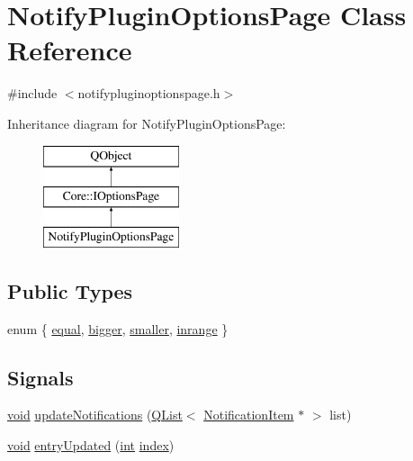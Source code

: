 \hypertarget{class_notify_plugin_options_page}{\section{Notify\-Plugin\-Options\-Page Class Reference}
\label{class_notify_plugin_options_page}
}


{\ttfamily \#include $<$notifypluginoptionspage.\-h$>$}

Inheritance diagram for Notify\-Plugin\-Options\-Page\-:\begin{figure}[H]
\begin{center}
\leavevmode
\includegraphics[height=3.000000cm]{class_notify_plugin_options_page}
\end{center}
\end{figure}
\subsection*{Public Types}
\begin{DoxyCompactItemize}
\item 
enum \{ \hyperlink{group__notify_gga986cf4be07b969743c640a94c64951a6a5215660515a642089b68f6e4fb7ebb77}{equal}, 
\hyperlink{group__notify_gga986cf4be07b969743c640a94c64951a6a0645a6aff2f8f76e753f1eaf08fd4cb0}{bigger}, 
\hyperlink{group__notify_gga986cf4be07b969743c640a94c64951a6a3bd98b14a252e90591e9f7b8c70c995b}{smaller}, 
\hyperlink{group__notify_gga986cf4be07b969743c640a94c64951a6a4cd2df3d72786caddbe5e90598da981a}{inrange}
 \}
\end{DoxyCompactItemize}
\subsection*{Signals}
\begin{DoxyCompactItemize}
\item 
\hyperlink{group___u_a_v_objects_plugin_ga444cf2ff3f0ecbe028adce838d373f5c}{void} \hyperlink{group__notify_gadbd273176d3047b997383d3791fcf3aa}{update\-Notifications} (\hyperlink{class_q_list}{Q\-List}$<$ \hyperlink{class_notification_item}{Notification\-Item} $\ast$ $>$ list)
\item 
\hyperlink{group___u_a_v_objects_plugin_ga444cf2ff3f0ecbe028adce838d373f5c}{void} \hyperlink{group__notify_gacfc979fcc446bc951c04ba8741231190}{entry\-Updated} (\hyperlink{ioapi_8h_a787fa3cf048117ba7123753c1e74fcd6}{int} \hyperlink{glext_8h_ab47dd9958bcadea08866b42bf358e95e}{index})
\end{DoxyCompactItemize}
